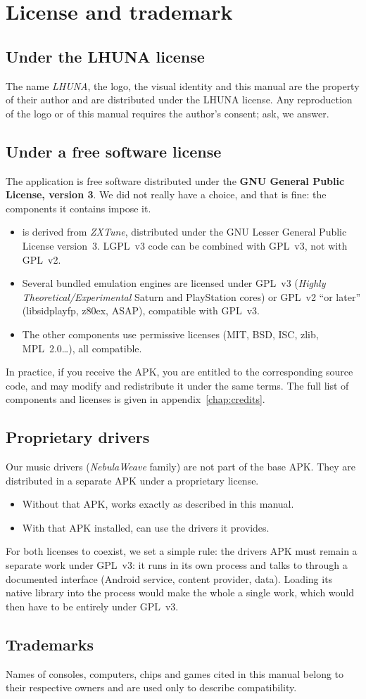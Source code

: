 \chapter*{License and trademark}

\section*{Under the LHUNA license}
The name \emph{LHUNA}, the logo, the visual identity and this manual are the property of their author and are
distributed under the LHUNA license. Any reproduction of the logo or of this manual requires the author's consent; ask, we answer.

\section*{Under a free software license}
The \soft application is free software distributed under the \textbf{GNU General Public License, version 3}. We did not
really have a choice, and that is fine: the components it contains impose it.
\begin{itemize}
  \item \soft is derived from \emph{ZXTune}, distributed under the GNU Lesser General Public License version~3.
        LGPL~v3 code can be combined with GPL~v3, not with GPL~v2.
  \item Several bundled emulation engines are licensed under GPL~v3 (\emph{Highly Theoretical/Experimental}
        Saturn and PlayStation cores) or GPL~v2 ``or later'' (libsidplayfp, z80ex, ASAP), compatible with GPL~v3.
  \item The other components use permissive licenses (MIT, BSD, ISC, zlib, MPL~2.0\dots), all compatible.
\end{itemize}
In practice, if you receive the APK, you are entitled to the corresponding source code, and may modify and
redistribute it under the
same terms. The full list of components and licenses is given in appendix~\ref{chap:credits}.

\section*{Proprietary drivers}
Our music drivers (\emph{NebulaWeave} family) are not part of the base APK. They are distributed in a
separate APK under a proprietary license.
\begin{itemize}
  \item Without that APK, \soft works exactly as described in this manual.
  \item With that APK installed, \soft can use the drivers it provides.
\end{itemize}
For both licenses to coexist, we set a simple rule: the drivers APK must remain a separate work under GPL~v3: it runs in its own process and
talks to \soft through a documented interface (Android service, content provider, data). Loading its native library
into the \soft process would make the whole a single work, which would then have to be entirely under GPL~v3.

\section*{Trademarks}
Names of consoles, computers, chips and games cited in this manual belong to their respective owners and are used
only to describe compatibility.
